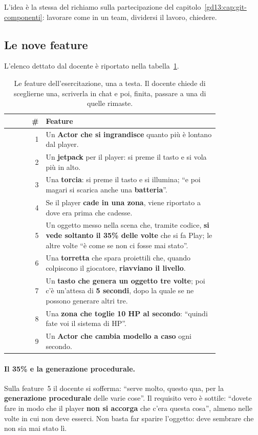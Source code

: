 L'idea è la stessa del richiamo sulla partecipazione del
capitolo~\ref{gd13:cap:git-componenti}: lavorare come in un team, dividersi il
lavoro, chiedere.

\subsection{Le nove feature}

L'elenco dettato dal docente è riportato nella tabella~\ref{gd16:tab:feature}.

\begin{table}[htbp]
\centering
\small
\begin{tabular}{@{}r p{0.82\linewidth}@{}}
\toprule
\# & \textbf{Feature} \\
\midrule
1 & Un \textbf{Actor che si ingrandisce} quanto più è lontano dal player. \\
2 & Un \textbf{jetpack} per il player: si preme il tasto e si vola più in alto. \\
3 & Una \textbf{torcia}: si preme il tasto e si illumina; ``e poi magari si
    scarica anche una \textbf{batteria}''. \\
4 & Se il player \textbf{cade in una zona}, viene riportato a dove era prima che
    cadesse. \\
5 & Un oggetto messo nella scena che, tramite codice, \textbf{si vede soltanto il
    35\% delle volte} che si fa Play; le altre volte ``è come se non ci fosse mai
    stato''. \\
6 & Una \textbf{torretta} che spara proiettili che, quando colpiscono il
    giocatore, \textbf{riavviano il livello}. \\
7 & Un \textbf{tasto che genera un oggetto tre volte}; poi c'è un'attesa di
    \textbf{5 secondi}, dopo la quale se ne possono generare altri tre. \\
8 & Una \textbf{zona che toglie 10 HP al secondo}: ``quindi fate voi il sistema
    di HP''. \\
9 & Un \textbf{Actor che cambia modello a caso} ogni secondo. \\
\bottomrule
\end{tabular}
\caption{Le feature dell'esercitazione, una a testa. Il docente chiede di
sceglierne una, scriverla in chat e poi, finita, passare a una di quelle rimaste.}
\label{gd16:tab:feature}
\end{table}

\paragraph{Il 35\% e la generazione procedurale.} Sulla feature~5 il docente si
sofferma: ``serve molto, questo qua, per la \textbf{generazione procedurale}
delle varie cose''. Il requisito vero è sottile: ``dovete fare in modo che il
player \textbf{non si accorga} che c'era questa cosa'', almeno nelle volte in cui
non deve esserci. Non basta far sparire l'oggetto: deve sembrare che non sia mai
stato lì.

